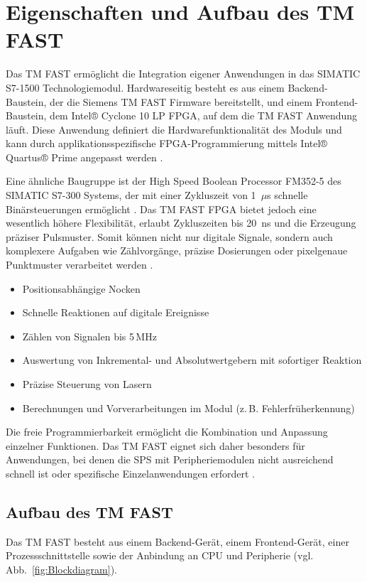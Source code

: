 \section{Eigenschaften und Aufbau des TM FAST}
\label{chap:TMFAST}
Das TM FAST ermöglicht die Integration eigener Anwendungen in das SIMATIC S7-1500 Technologiemodul. Hardwareseitig besteht es aus einem Backend-Baustein, der die Siemens TM FAST Firmware bereitstellt, und einem Frontend-Baustein, dem Intel® Cyclone 10 LP FPGA, auf dem die TM FAST Anwendung läuft. Diese Anwendung definiert die Hardwarefunktionalität des Moduls und kann durch applikationsspezifische FPGA-Programmierung mittels Intel® Quartus® Prime angepasst werden \cite{tmfast_featurespec, TmFast_progrmming_manual}.

Eine ähnliche Baugruppe ist der High Speed Boolean Processor FM352-5 des SIMATIC S7-300 Systems, der mit einer Zykluszeit von 1~\(\mu\)s schnelle Binärsteuerungen ermöglicht \cite{siemens_fm3525}. Das TM FAST FPGA bietet jedoch eine wesentlich höhere Flexibilität, erlaubt Zykluszeiten bis 20~ns und die Erzeugung präziser Pulsmuster. Somit können nicht nur digitale Signale, sondern auch komplexere Aufgaben wie Zählvorgänge, präzise Dosierungen oder pixelgenaue Punktmuster verarbeitet werden \cite{TmFast_progrmming_manual}.

\begin{itemize}
    \item Positionsabhängige Nocken
    \item Schnelle Reaktionen auf digitale Ereignisse
    \item Zählen von Signalen bis 5\,MHz
    \item Auswertung von Inkremental- und Absolutwertgebern mit sofortiger Reaktion
    \item Präzise Steuerung von Lasern
    \item Berechnungen und Vorverarbeitungen im Modul (z.\,B. Fehlerfrüherkennung)
\end{itemize}

Die freie Programmierbarkeit ermöglicht die Kombination und Anpassung einzelner Funktionen. Das TM FAST eignet sich daher besonders für Anwendungen, bei denen die SPS mit Peripheriemodulen nicht ausreichend schnell ist oder spezifische Einzelanwendungen erfordert \cite{kick2023}.

\subsection*{Aufbau des TM FAST}
\label{Aufbau des TM FAST}
Das TM FAST besteht aus einem Backend-Gerät, einem Frontend-Gerät, einer Prozessschnittstelle sowie der Anbindung an CPU und Peripherie (vgl. Abb.~\ref{fig:Blockdiagram}).

